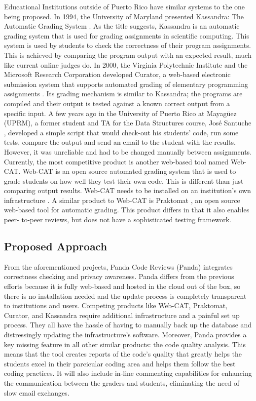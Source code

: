 Educational Institutions outside of Puerto Rico have similar systems to the one
being proposed. In 1994, the University of Maryland presented Kassandra: The
Automatic Grading System \cite{Matt1994}. As the title suggests, Kassandra is an
automatic grading system that is used for grading assignments in scientific
computing. This system is used by students to check the correctness of their
program assignments. This is achieved by comparing the program output with an
expected result, much like current online judges do. In 2000, the Virginia
Polytechnic Institute and the Microsoft Research Corporation developed Curator,
a web-based electronic submission system that supports automated grading of
elementary programming assignments \cite{Curator}. Its grading mechanism is
similar to Kassandra; the programs are compiled and their output is tested
against a known correct output from a specific input. A few years ago in the
University of Puerto Rico at Mayagüez (UPRM), a former student and TA for the
Data  Structures course, José Santuche \cite{Santuche}, developed a simple
script that would check-out his students' code, run some tests, compare the
output and send an email to the student with the results. However, it was
unreliable and had to be changed manually between assignments. Currently, the
most competitive product is another web-based tool named Web-CAT. Web-CAT is an
open source automated grading system that is used to grade students on how well
they test their own code. This is different than just comparing output results.
Web-CAT needs to be installed on an institution's own infrastructure
\cite{WebCat}. A similar product to Web-CAT is Praktomat \cite{Praktomat}, an
open source web-based tool for automatic grading. This product differs in that
it also enables peer- to-peer reviews, but does not have a sophisticated testing
framework.

\subsection{Proposed Approach}

From the aforementioned projects, Panda Code Reviews (Panda) integrates
correctness checking and privacy awareness. Panda differs from the previous
efforts because it is fully web-based and hosted in the cloud out of the box, so
there is no installation needed and the update process is completely transparent
to institutions and users. Competing products like Web-CAT, Praktomat, Curator,
and Kassandra require additional infrastructure and a painful set up process.
They all have the hassle of having to manually back up the database and
distressingly updating the infrastructure's software. Moreover, Panda provides a
key missing feature in all other similar products: the code quality analysis.
This means that the tool creates reports of the code's quality that greatly
helps the students excel in their parcicular coding area and helps them follow
the best coding practices. It will also include in-line commenting capabilities
for enhancing the communication between the graders and students, eliminating
the need of slow email exchanges.

